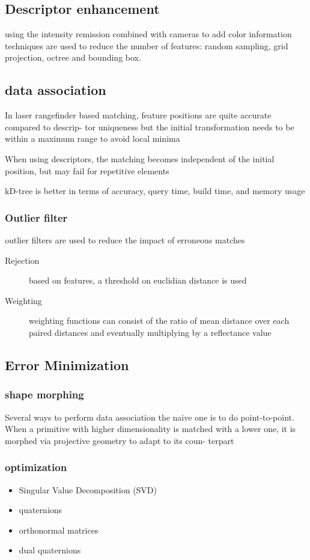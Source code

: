 \documentclass[twoside,twocolumn]{article}
\begin{document}
\subsection{Descriptor enhancement}

using the intensity remission
combined with cameras to add color information
techniques are used to reduce the number of features: random sampling,
grid projection, octree and bounding box.

\subsection{data association}
In laser rangefinder based
matching, feature positions are quite accurate compared to descrip-
tor uniqueness but the initial transformation needs to be within
a maximum range to avoid local minima

When using descriptors, the matching becomes independent of the initial position,
but may fail for repetitive elements

kD-tree is better in terms of accuracy, query time, build time,
and memory usage

\subsubsection{Outlier filter}
outlier filters are used to reduce the impact of erroneous matches
\begin{description}
  \item[Rejection] based on features, a threshold on euclidian distance is used
  \item[Weighting] weighting functions can consist of the ratio of mean distance
  over each paired distances and eventually multiplying by a reflectance value
\end{description}

\subsection{Error Minimization}
\subsubsection{shape morphing}
Several ways to perform data association the naive one is to do point-to-point.
When a primitive with higher dimensionality is matched with a lower one,
it is morphed via projective geometry to adapt to its coun-
terpart
\subsubsection{optimization}
\begin{itemize}
  \item Singular Value Decomposition (SVD) \cite{arun_least-squares_1987}
  \item quaternions \cite{horn_closed-form_1987}
  \item orthonormal matrices \cite{horn_closed_1988}
  \item dual quaternions \cite{walker_estimating_1991}
\end{itemize}
\end{document}
